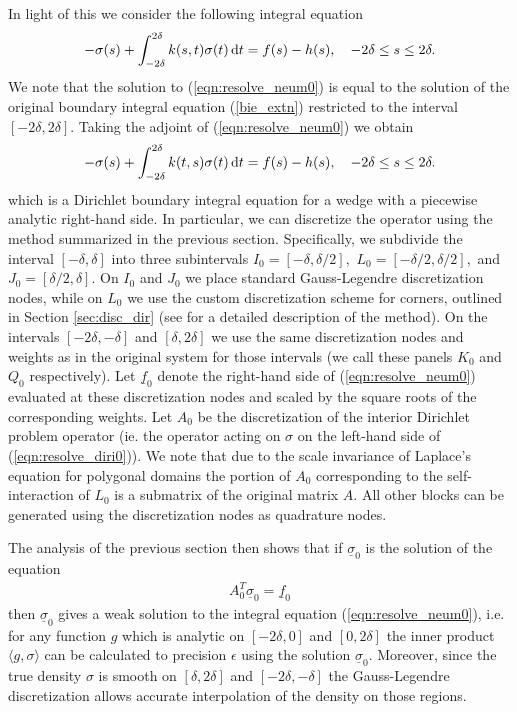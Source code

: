 In light of this we consider the following integral equation
\begin{align}\label{eqn:resolve_neum0}
-\sigma(s) + \int_{-2\delta}^{2\delta} k(s,t) \sigma(t)\,{\rm d}t = f(s)-h(s), \quad -2\delta \le s \le 2\delta.
\end{align}
We note that the solution to (\ref{eqn:resolve_neum0}) is equal to the solution of the original boundary integral equation (\ref{bie_extn}) restricted to the interval $[-2\delta,2\delta].$ Taking the adjoint of (\ref{eqn:resolve_neum0}) we obtain
\begin{align}\label{eqn:resolve_diri0}
-\sigma(s) + \int_{-2\delta}^{2\delta} k(t,s) \sigma(t)\,{\rm d}t = f(s)-h(s), \quad -2\delta \le s \le 2\delta.
\end{align}
which is a Dirichlet boundary integral equation for a wedge with a piecewise analytic right-hand side. In particular, we can discretize the operator using the method summarized in the previous section. Specifically, we subdivide the interval $[-\delta,\delta]$ into three subintervals $I_0 = [-\delta,\delta/2],$ $L_0 = [-\delta/2,\delta/2],$ and $J_0 = [\delta/2,\delta].$ On $I_0$ and $J_0$ we place standard Gauss-Legendre discretization nodes, while on $L_0$ we use the custom discretization scheme for corners, outlined in Section \ref{sec:disc_dir} (see \cite{} for a detailed description of the method). On the intervals $[-2\delta,-\delta]$ and $[\delta,2\delta]$ we use the same discretization nodes and weights as in the original system for those intervals (we call these panels $K_0$ and $Q_0$ respectively). Let $\underline{f}_0$ denote the right-hand side of (\ref{eqn:resolve_neum0}) evaluated at these discretization nodes and scaled by the square roots of the corresponding weights. Let $A_0$ be the discretization of the interior Dirichlet problem operator (ie. the operator acting on $\sigma$ on the left-hand side of (\ref{eqn:resolve_diri0})). We note that due to the scale invariance of Laplace's equation for polygonal domains the portion of $A_0$ corresponding to the self-interaction of $L_0$ is a submatrix of the original matrix $A.$ All other blocks can be generated using the discretization nodes as quadrature nodes.

The analysis of the previous section then shows that if $\underline{\sigma}_0$ is the solution of the equation
\begin{align}
A_0^T \underline{\sigma}_0 = \underline{f}_0
\end{align}
then $\underline{\sigma}_0$ gives a {weak solution} to the integral equation (\ref{eqn:resolve_neum0}), i.e. for any function $g$ which is analytic on $[-2\delta,0]$ and $[0,2\delta]$ the inner product $\langle g,\sigma \rangle$ can be calculated to precision $\epsilon$ using the solution $\underline{\sigma}_0.$ Moreover, since the true density $\sigma$ is smooth on $[\delta,2\delta]$ and $[-2\delta,-\delta]$ the Gauss-Legendre discretization allows accurate interpolation of the density on those regions.

